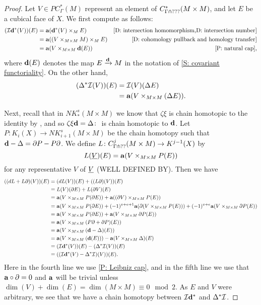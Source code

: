 \documentclass{amsart}
\begin{document}
\begin{proof}
	Let $V \in PC^*_\Gamma(M)$ represent an element of $C^*_{\Gamma \pitchfork ???}(M \times M)$, and let $E$ be a cubical face of $X$.
	We first compute as follows:
	\begin{align*}
		(\mc I \diag^*(V))(E) & = \aug(\diag^*(V) \times_M  E) &\text{\cref{D: intersection homomorphism,D: intersection number}}\\
		&=\aug((V \times_{M \times M} M) \times_M E) &\text{\cref{D: cohomology pullback and homology transfer}}\\
		&=\aug(V \times_{M \times M} \diag(E)) &\text{\cref{P: natural cap}},
	\end{align*}
	where $\mathbf{d}(E)$ denotes the map $E \xrightarrow{\mathbf{d}} M$ in the notation of \cref{S: covariant functoriality}.
	On the other hand,
		\begin{align*}
		(\Delta^*\mathcal{I}(V))(E) & = \mathcal{I}(V)(\Delta E)\\
		&=\mathbf{a}(V \times_{M \times M} (\Delta E)).
	\end{align*}

	Next, recall that in $NK^s_*(M \times M)$ we know that $\zeta \xi$ is chain homotopic to the identity by \cite[Section XI.5]{Mas91}, and so $\zeta\xi \mathbf{d} = \Delta \colon $ is chain homotopic to $\mathbf{d}$.
	Let $P \colon K_i(X) \to NK^s_{i+1}(M \times M)$ be the chain homotopy such that $\mathbf{d} - \Delta = \partial P - P \partial$.
	We define $L \colon C^j_{\Gamma \pitchfork ??}(M \times M) \to K^{j-1}(X)$ by $$L(\underline{V})(E) = \mathbf{a}(V \times_{M \times M} P(E))$$
	for any representative $V$ of $\underline{V}$ (WELL DEFINED BY).
	Then we have
	\begin{align*}
		((dL + L\partial)(V))(E) &=(dL(V))(E) + ((L\partial)(V))(E) \\
			& = L(V)(\partial E) +L(\partial V)(E)\\
			& = \mathbf{a}(V \times_{M \times M} P(\partial E)) + \mathbf{a}((\partial V) \times_{M \times M} P(E))\\
			& = \mathbf{a}(V \times_{M \times M} P(\partial E)) + (-1)^{v+e+1}\mathbf{a}(\partial(V \times_{M \times M} P(E)))+(-1)^{v+e}\mathbf{a}(V \times_{M \times M} \partial P(E))\\
			&=\mathbf{a}(V \times_{M \times M} P(\partial E)) +\mathbf{a}(V \times_{M \times M} \partial P(E))\\
			&=\mathbf{a}(V \times_{M \times M} (P\partial + \partial P)(E))\\
			&=\mathbf{a}(V \times_{M \times M} (\mathbf{d} - \Delta)(E))\\
			&=\mathbf{a}(V \times_{M \times M} (\mathbf{d}(E))) - \mathbf{a}(V \times_{M \times M} \Delta)(E)\\
			&=(\mathcal{I} \mathbf{d}^*(V))(E)- 	(\Delta^*\mathcal{I}(V))(E)\\
			&=((\mathcal{I} \mathbf{d}^*(V)- \Delta^*\mathcal{I})(V))(E).
	\end{align*}
	Here in the fourth line we use \cref{P: Leibniz cap}, and in the fifth line we use that $\mathbf{a} \circ \partial =0$  and $\mathbf{a}$ will be trivial unless $\dim(V)+ \dim(E) = \dim(M \times M) \equiv 0 \mod 2$.
	As $E$ and $V$ were arbitrary, we see that we have a chain homotopy between $\mathcal{I} \mathbf{d}^*$ and $\Delta^*\mathcal{I}$.










\end{proof}
\end{document}
